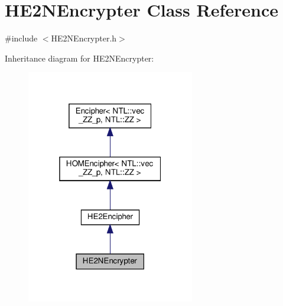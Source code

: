 \hypertarget{classHE2NEncrypter}{}\section{H\+E2\+N\+Encrypter Class Reference}
\label{classHE2NEncrypter}


{\ttfamily \#include $<$H\+E2\+N\+Encrypter.\+h$>$}



Inheritance diagram for H\+E2\+N\+Encrypter\+:\nopagebreak
\begin{figure}[H]
\begin{center}
\leavevmode
\includegraphics[width=208pt]{classHE2NEncrypter__inherit__graph}
\end{center}
\end{figure}


